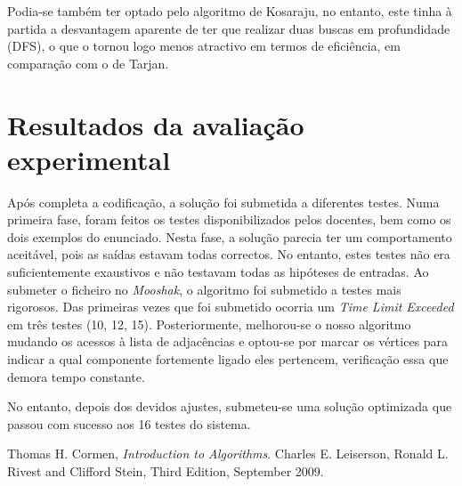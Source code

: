 \documentclass[12pt]{article}
\begin{document}
Podia-se também ter optado pelo algoritmo de Kosaraju, no entanto, este tinha à partida a desvantagem aparente de ter que realizar duas buscas em profundidade (DFS), o que o tornou logo menos atractivo em termos de eficiência, em comparação com o de Tarjan.

\section*{Resultados da avaliação experimental}

Após completa a codificação, a solução foi submetida a diferentes testes. Numa primeira fase, foram feitos os testes disponibilizados pelos docentes, bem como os dois exemplos do enunciado. Nesta fase, a solução parecia ter um comportamento aceitável, pois as saídas estavam todas correctos. No entanto, estes testes não era suficientemente exaustivos e não testavam todas as hipóteses de entradas. Ao submeter o ficheiro no \emph{Mooshak}, o algoritmo foi submetido a testes mais rigorosos. Das primeiras vezes que foi submetido ocorria um \emph{Time Limit Exceeded} em três testes (10, 12, 15). Posteriormente, melhorou-se o nosso algoritmo mudando os acessos à lista de adjacências e optou-se por marcar os vértices para indicar a qual componente fortemente ligado eles pertencem, verificação essa que demora tempo constante.

No entanto, depois dos devidos ajustes, submeteu-se uma solução optimizada que passou com sucesso aos 16 testes do sistema.

\begin{thebibliography}{9}

  Thomas H. Cormen,
  \emph{Introduction to Algorithms}.
  Charles E. Leiserson, Ronald L. Rivest and Clifford Stein,
  Third Edition,
  September 2009.

\end{thebibliography}
\end{document}
